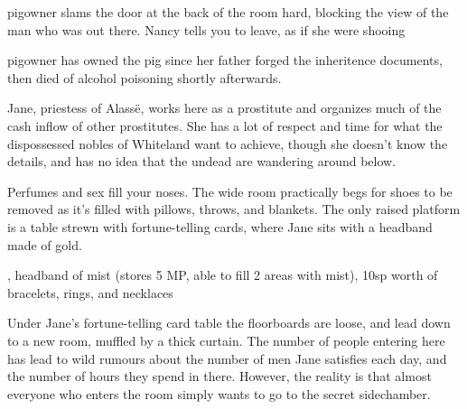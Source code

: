 \begin{multicols}{2}
\begin{boxtext}

	\Gls{pigowner} slams the door at the back of the room hard, blocking the view of the man who was out there.  Nancy tells you to leave, as if she were shooing 

\end{boxtext}


\Gls{pigowner} has owned the pig since her father forged the inheritence documents, then died of alcohol poisoning shortly afterwards.



Jane, priestess of Alass\"{e}, works here as a prostitute and organizes much of the cash inflow of other prostitutes.  She has a lot of respect and time for what the dispossessed nobles of Whiteland want to achieve, though she doesn't know the details, and has no idea that the undead are wandering around below.

\begin{boxtext}

	Perfumes and sex fill your noses.  The wide room practically begs for shoes to be removed as it's filled with pillows, throws, and blankets.  The only raised platform is a table strewn with fortune-telling cards, where Jane sits with a headband made of gold.

\end{boxtext}


%
{\Dagger, headband of mist (stores 5 MP, able to fill 2 areas with mist), 10sp worth of bracelets, rings, and necklaces}%
{}

Under Jane's fortune-telling card table the floorboards are loose, and lead down to a new room, muffled by a thick curtain.  The number of people entering here has lead to wild rumours about the number of men Jane satisfies each day, and the number of hours they spend in there.  However, the reality is that almost everyone who enters the room simply wants to go to the secret sidechamber.


\end{multicols}
